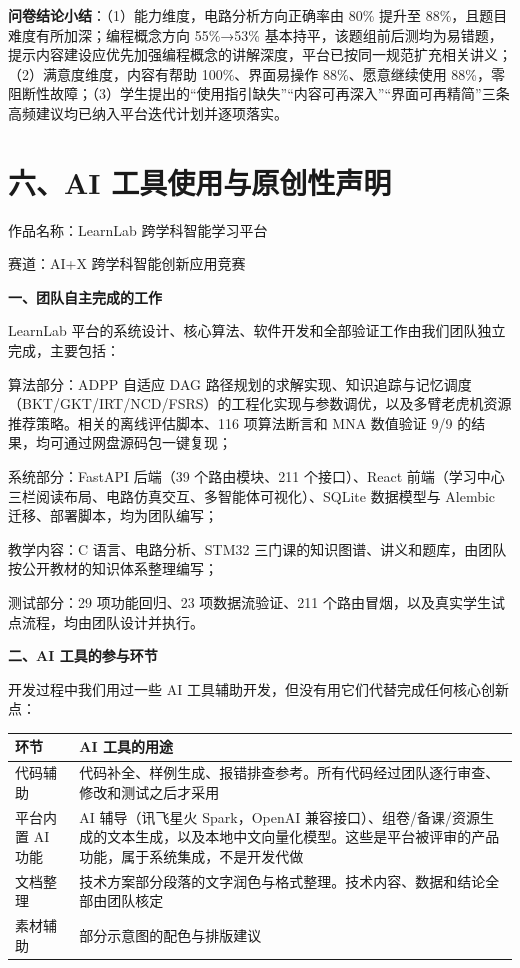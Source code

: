 \documentclass[zihao=-4,a4paper,UTF8,fontset=windows]{ctexart}
\begin{document}
\textbf{问卷结论小结}：（1）能力维度，电路分析方向正确率由 80\% 提升至 88\%，且题目难度有所加深；编程概念方向 55\%→53\% 基本持平，该题组前后测均为易错题，提示内容建设应优先加强编程概念的讲解深度，平台已按同一规范扩充相关讲义；（2）满意度维度，内容有帮助 100\%、界面易操作 88\%、愿意继续使用 88\%，零阻断性故障；（3）学生提出的“使用指引缺失”“内容可再深入”“界面可再精简”三条高频建议均已纳入平台迭代计划并逐项落实。


\section{六、AI 工具使用与原创性声明}

作品名称：LearnLab 跨学科智能学习平台

赛道：AI+X 跨学科智能创新应用竞赛

\textbf{一、团队自主完成的工作}

LearnLab 平台的系统设计、核心算法、软件开发和全部验证工作由我们团队独立完成，主要包括：

算法部分：ADPP 自适应 DAG 路径规划的求解实现、知识追踪与记忆调度（BKT/GKT/IRT/NCD/FSRS）的工程化实现与参数调优，以及多臂老虎机资源推荐策略。相关的离线评估脚本、116 项算法断言和 MNA 数值验证 9/9 的结果，均可通过网盘源码包一键复现；

系统部分：FastAPI 后端（39 个路由模块、211 个接口）、React 前端（学习中心三栏阅读布局、电路仿真交互、多智能体可视化）、SQLite 数据模型与 Alembic 迁移、部署脚本，均为团队编写；

教学内容：C 语言、电路分析、STM32 三门课的知识图谱、讲义和题库，由团队按公开教材的知识体系整理编写；

测试部分：29 项功能回归、23 项数据流验证、211 个路由冒烟，以及真实学生试点流程，均由团队设计并执行。

\textbf{二、AI 工具的参与环节}

开发过程中我们用过一些 AI 工具辅助开发，但没有用它们代替完成任何核心创新点：

\par\noindent\begin{tabular}{|p{3.4cm}|p{10.6cm}|}
\hline
\textbf{环节} & \textbf{AI 工具的用途} \\ \hline
代码辅助 & 代码补全、样例生成、报错排查参考。所有代码经过团队逐行审查、修改和测试之后才采用 \\ \hline
平台内置 AI 功能 & AI 辅导（讯飞星火 Spark，OpenAI 兼容接口）、组卷/备课/资源生成的文本生成，以及本地中文向量化模型。这些是平台被评审的产品功能，属于系统集成，不是开发代做 \\ \hline
文档整理 & 技术方案部分段落的文字润色与格式整理。技术内容、数据和结论全部由团队核定 \\ \hline
素材辅助 & 部分示意图的配色与排版建议 \\ \hline
\end{tabular}\par
\end{document}
